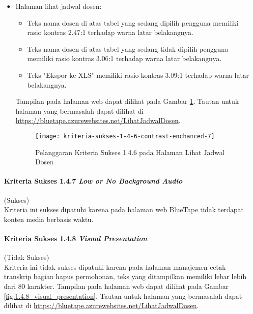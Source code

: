 \begin{itemize}
    \item Halaman lihat jadwal dosen: 
    \begin{itemize}
        \item Teks nama dosen di atas tabel yang sedang dipilih pengguna memiliki rasio kontras 2.47:1 terhadap warna latar belakangnya.
        \item Teks nama dosen di atas tabel yang sedang tidak dipilih pengguna memiliki rasio kontras 3.06:1 terhadap warna latar belakangnya.
        \item Teks "Ekspor ke XLS" memiliki rasio kontras 3.09:1 terhadap warna latar belakangnya.
    \end{itemize}
    Tampilan pada halaman web dapat dilihat pada Gambar \ref{fig:1.4.6_contrast_enchanced_7}. Tautan untuk halaman yang bermasalah dapat dilihat di \url{https://bluetape.azurewebsites.net/LihatJadwalDosen}.
    \begin{figure}[H]
        \centering  
        \texttt{[image: kriteria-sukses-1-4-6-contrast-enchanced-7]}  
        \caption[Pelanggaran Kriteria Sukses 1.4.6 pada Halaman Lihat Jadwal Dosen]{Pelanggaran Kriteria Sukses 1.4.6 pada Halaman Lihat Jadwal Dosen}
        \label{fig:1.4.6_contrast_enchanced_7}  
    \end{figure} 
\end{itemize}

\paragraph{Kriteria Sukses 1.4.7 \textit{Low or No Background Audio}}
\label{par:kepatuhan_bluetape_kriteria_sukses_1.4.7}
(Sukses)\\

Kriteria ini sukses dipatuhi karena pada halaman web BlueTape tidak terdapat konten media berbasis waktu.

\paragraph{Kriteria Sukses 1.4.8 \textit{Visual Presentation}}
\label{par:kepatuhan_bluetape_kriteria_sukses_1.4.8}
(Tidak Sukses)\\

Kriteria ini tidak sukses dipatuhi karena pada halaman manajemen cetak transkrip bagian hapus permohonan, teks yang ditampilkan memiliki lebar lebih dari 80 karakter. Tampilan pada halaman web dapat dilihat pada Gambar \ref{fig:1.4.8_visual_presentation}. Tautan untuk halaman yang bermasalah dapat dilihat di \url{https://bluetape.azurewebsites.net/LihatJadwalDosen}.

